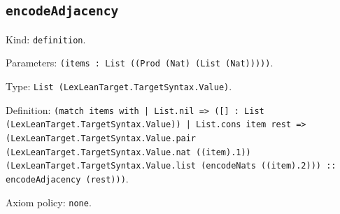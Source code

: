 \documentclass[11pt]{article}
\begin{document}
\subsection*{\texttt{encodeAdjacency}}
\noindent Kind: \texttt{definition}.\par
\noindent Parameters: \texttt{(items : List ((Prod (Nat) (List (Nat)))))}.\par
\noindent Type: \texttt{List (LexLeanTarget.TargetSyntax.Value)}.\par
\noindent Definition: \texttt{(match items with | List.nil => ([] : List (LexLeanTarget.TargetSyntax.Value)) | List.cons item rest => (LexLeanTarget.TargetSyntax.Value.pair (LexLeanTarget.TargetSyntax.Value.nat ((item).1)) (LexLeanTarget.TargetSyntax.Value.list (encodeNats ((item).2))) :: encodeAdjacency (rest)))}.\par
\noindent Axiom policy: \texttt{none}.\par
\end{document}

